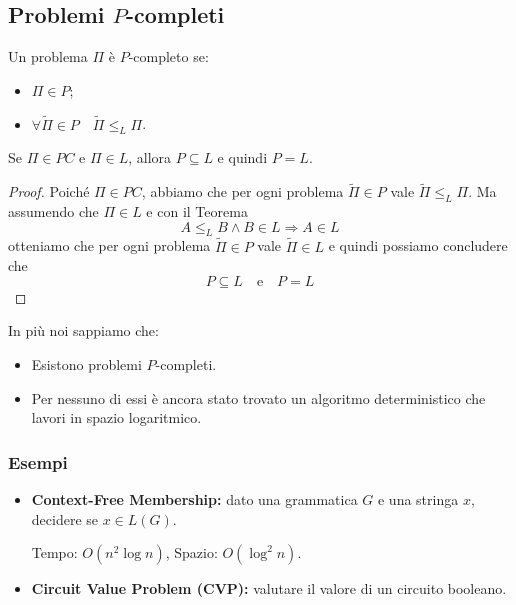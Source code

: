 \subsection{Problemi $P$-completi}

Un problema $\Pi$ è $P$-completo se:
\begin{itemize}
    \item $\Pi \in P$;
    \item $\forall \widetilde{\Pi} \in P \quad \widetilde{\Pi} \leq_L \Pi$. \\
\end{itemize}

\begin{theor}
Se $\Pi \in PC$ e $\Pi \in L$, allora $P \subseteq L$ e quindi $P = L$.
\end{theor}

\begin{proof}
Poiché $\Pi \in PC$, abbiamo che per ogni problema $ \widetilde{\Pi}  \in P$ vale $ \widetilde{\Pi}  \leq_L \Pi$. Ma assumendo che $\Pi \in L$ e con il Teorema
\[ A \leq_L B \land B \in L \Rightarrow A \in L \]
otteniamo che per ogni problema $\widetilde{\Pi} \in P$ vale $\widetilde{\Pi} \in L$ e quindi possiamo concludere che
\[ P \subseteq L \quad \text{e} \quad P = L \]
\end{proof}

In più noi sappiamo che:
\begin{itemize}
    \item Esistono problemi $P$-completi.
 
    \item Per nessuno di essi è ancora stato trovato un algoritmo deterministico che lavori in spazio logaritmico.
\end{itemize}

\subsubsection{Esempi}

\begin{itemize}
    \item \textbf{Context-Free Membership:} dato una grammatica $G$ e una stringa $x$, decidere se $x \in L(G)$.

    Tempo: $O(n^2 \log n)$, Spazio: $O(\log^2 n)$.

    \item \textbf{Circuit Value Problem (CVP):} valutare il valore di un circuito booleano.
\end{itemize}

